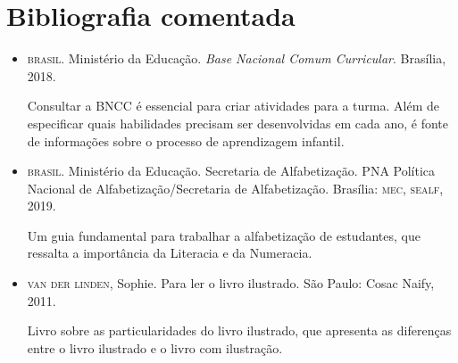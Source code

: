 \documentclass[11pt]{extarticle}
\begin{document}
\section{Bibliografia comentada}

\begin{itemize}
\item \textsc{brasil}. Ministério da Educação. \textit{Base Nacional Comum Curricular}. Brasília, 2018.

Consultar a \textsc{BNCC} é essencial para criar atividades para a turma. Além de especificar 
quais habilidades precisam ser desenvolvidas em cada ano, é fonte de informações sobre 
o processo de aprendizagem infantil. 
 
\item \textsc{brasil}. Ministério da Educação. Secretaria de Alfabetização. PNA Política Nacional de Alfabetização/Secretaria 
de Alfabetização. Brasília: \textsc{mec, sealf}, 2019.

Um guia fundamental para trabalhar a alfabetização de estudantes, que ressalta a importância da Literacia e da Numeracia. 

\item \textsc{van der linden}, Sophie. Para ler o livro ilustrado. São Paulo: Cosac Naify, 2011.

Livro sobre as particularidades do livro ilustrado, que apresenta as diferenças entre o livro ilustrado e o livro com ilustração. 
\end{itemize}
\end{document}
